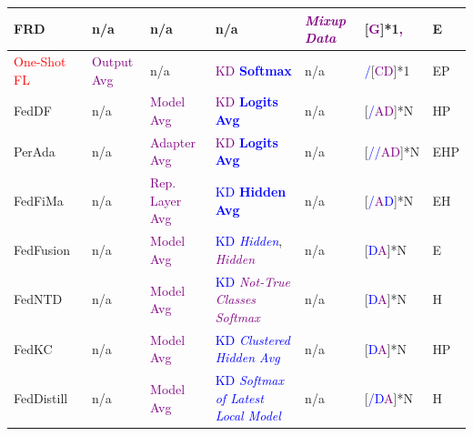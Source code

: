 \begin{table}[htp]
\begin{tabular}{|p{2.05cm}|p{1.36cm}|p{1.56cm}|p{4.35cm}|p{2.77cm}|p{1.5cm}|p{0.35cm}|}
    \rowcolor[gray]{.9}
    FRD~\cite{cha2019federated} & n/a & n/a & n/a & \textcolor{purple}{\textit{Mixup Data}} &[\textcolor{purple}{G}]*1\textcolor{purple}{,} & E \\ \hline

    \textcolor{red}{One-Shot FL}~\cite{guha2018one} & \textcolor{purple}{Output Avg} & n/a & \textcolor{purple}{KD} \textcolor{blue}{\textbf{Softmax}} & n/a & \textcolor{blue}{/}[\textcolor{purple}{CD}]*1 & EP \\ \hline %

    \rowcolor[gray]{.9}
    FedDF~\cite{lin2020ensemble} & n/a & \textcolor{purple}{Model Avg} & \textcolor{purple}{KD}  \textcolor{blue}{\textbf{Logits Avg}} & n/a & [\textcolor{blue}{/}\textcolor{purple}{AD}]*N & HP \\ \hline %

    PerAda~\cite{xie2023perada} & n/a & \textcolor{purple}{Adapter Avg} & \textcolor{purple}{KD} \textcolor{blue}{\textbf{Logits Avg}} & n/a & [\textcolor{blue}{//}\textcolor{purple}{AD}]*N & EHP \\ \hline

    \rowcolor[gray]{.9}
    FedFiMa~\cite{che2022federated} & n/a & \textcolor{purple}{Rep. Layer Avg} & \textcolor{blue}{KD} \textcolor{blue}{\textbf{Hidden Avg}} & n/a & [\textcolor{blue}{/}\textcolor{purple}{A}\textcolor{blue}{D}]*N & EH \\ \hline

    FedFusion~\cite{yao2019towards} & n/a & \textcolor{purple}{Model Avg} & \textcolor{blue}{KD} \textcolor{blue}{\textit{Hidden}}, \textcolor{purple}{\textit{Hidden}} & n/a & [\textcolor{blue}{D}\textcolor{purple}{A}]*N & E \\ \hline %

    \rowcolor[gray]{.9}
    FedNTD~\cite{lee2022preservation} & n/a & \textcolor{purple}{Model Avg} & \textcolor{blue}{KD} \textcolor{purple}{\textit{Not-True Classes Softmax}} & n/a & [\textcolor{blue}{D}\textcolor{purple}{A}]*N & H \\ \hline %

    FedKC~\cite{wang2022fedkc} & n/a & \textcolor{purple}{Model Avg} & \textcolor{blue}{KD} \textcolor{blue}{\textit{Clustered Hidden Avg}} & n/a & [\textcolor{blue}{D}\textcolor{purple}{A}]*N & HP \\ \hline %

    \rowcolor[gray]{.9}
    FedDistill~\cite{jiang2020federated} & n/a & \textcolor{purple}{Model Avg} & \textcolor{blue}{KD \textit{Softmax of Latest Local Model}} & n/a &[\textcolor{blue}{/D}\textcolor{purple}{A}]*N & H \\ \hline %


\end{tabular}
\end{table}
